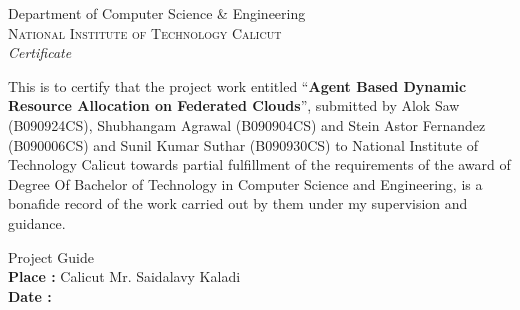 \pagestyle{plain}
\begin{center}
	\huge{Department of Computer Science \& Engineering}\\[0.5cm]
	\normalsize
	\textsc{National Institute of Technology Calicut}\\[2.0cm]
	\emph{\LARGE Certificate}\\[2.5cm]
\end{center}
This is to certify that the project work entitled ``\textbf{Agent Based Dynamic Resource Allocation on Federated Clouds}'', 
submitted by Alok Saw (B090924CS), Shubhangam Agrawal (B090904CS) and Stein Astor Fernandez (B090006CS) and Sunil Kumar Suthar (B090930CS) to National Institute of Technology Calicut towards 
partial fulfillment of the requirements of the award of Degree Of Bachelor of Technology 
in Computer Science and Engineering, is a bonafide record of the work carried out by them 
under my supervision and guidance.

\vspace*{1.5cm}
\noindent

\hfill Project Guide\\
\textbf{Place :} Calicut \hfill Mr. Saidalavy Kaladi\\
\textbf{Date :} \\


